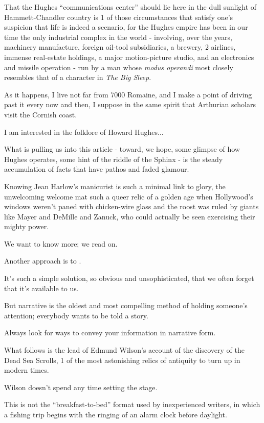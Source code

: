 \documentclass{book}
\numberwithin{equation}{section}
\begin{document}
That the Hughes ``communications center'' should lie here in the dull sunlight of Hammett-Chandler country is 1 of those circumstances that satisfy one's suspicion that life is indeed a scenario, for the Hughes empire has been in our time the only industrial complex in the world - involving, over the years, machinery manufacture, foreign oil-tool subsidiaries, a brewery, 2 airlines, immense real-estate holdings, a major motion-picture studio, and an electronics and missile operation - run by a man whose \textit{modus operandi} most closely resembles that of a character in \textit{The Big Sleep}.

%
As it happens, I live not far from 7000 Romaine, and I make a point of driving past it every now and then, I suppose in the same spirit that Arthurian scholars visit the Cornish coast.

I am interested in the folklore of Howard Hughes$\ldots$

%
What is pulling us into this article - toward, we hope, some glimpse of how Hughes operates, some hint of the riddle of the Sphinx - is the steady accumulation of facts that have pathos and faded glamour.

Knowing Jean Harlow's manicurist is such a minimal link to glory, the unwelcoming welcome mat such a queer relic of a golden age when Hollywood's windows weren't paned with chicken-wire glass and the roost was ruled by giants like Mayer and DeMille and Zanuck, who could actually be seen exercising their mighty power.

We want to know more; we read on.

%
Another approach is to .

It's such a simple solution, so obvious and unsophisticated, that we often forget that it's available to us.

But narrative is the oldest and most compelling method of holding someone's attention; everybody wants to be told a story.

Always look for ways to convey your information in narrative form.

What follows is the lead of Edmund Wilson's account of the discovery of the Dead Sea Scrolls, 1 of the most astonishing relics of antiquity to turn up in modern times.

Wilson doesn't spend any time setting the stage.

This is not the ``breakfast-to-bed'' format used by inexperienced writers, in which a fishing trip begins with the ringing of an alarm clock before daylight.
\end{document}
